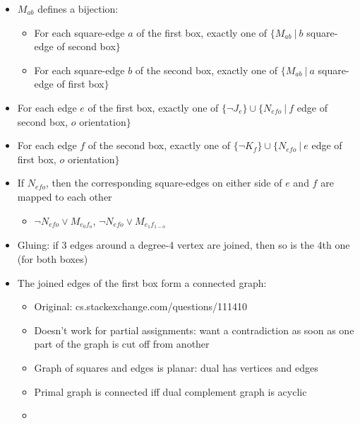 \documentclass{article}
\begin{document}
\begin{itemize}
\item $M_{ab}$ defines a bijection:
  \begin{itemize}
  \item
    For each square-edge $a$ of the first box,
    exactly one of $\{M_{ab}\ |\ b$ square-edge of second box$\}$
  \item
    For each square-edge $b$ of the second box,
    exactly one of $\{M_{ab}\ |\ a$ square-edge of first box$\}$
  \end{itemize}
\item
  For each edge $e$ of the first box, exactly one of
  $\{\lnot J_e\} \cup \{N_{efo}\ |\ f$ edge of second box, $o$ orientation$\}$
\item
  For each edge $f$ of the second box, exactly one of
  $\{\lnot K_f\} \cup \{N_{efo}\ |\ e$ edge of first box, $o$ orientation$\}$
\item
  If $N_{efo}$,
  then the corresponding square-edges on either side of $e$ and $f$
  are mapped to each other
  \begin{itemize}
  \item
    $\lnot N_{efo} \lor M_{e_0f_o}$,
    $\lnot N_{efo} \lor M_{e_1f_{1-o}}$
  \end{itemize}
\item
  Gluing: if 3 edges around a degree-4 vertex are joined,
  then so is the 4th one (for both boxes)
\item
  The joined edges of the first box form a connected graph:
  \begin{itemize}
  \item
    Original: cs.stackexchange.com/questions/111410
  \item
    Doesn't work for partial assignments:
    want a contradiction as soon as one part of the graph
    is cut off from another
  \item
    Graph of squares and edges is planar:
    dual has vertices and edges
  \item
    Primal graph is connected iff dual complement graph is acyclic
  \item

\end{itemize}
\end{itemize}
\end{document}
